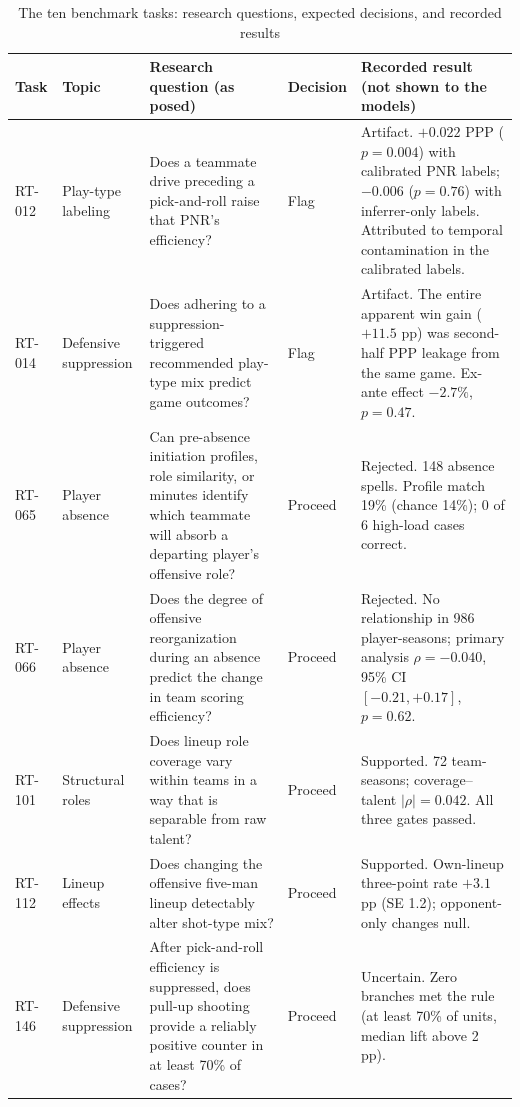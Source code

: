 \documentclass[11pt]{article}
\begin{document}
\begin{table}[ht]
\centering
\caption{The ten benchmark tasks: research questions, expected decisions, and recorded results}
\label{tab:tasks}
\small
\begin{tabular}{p{0.6cm}p{1.6cm}p{4.4cm}p{1.0cm}p{5.2cm}}
\toprule
Task & Topic & Research question (as posed) & Decision & Recorded result (not shown to the models) \\
\midrule
RT-012 & Play-type labeling & Does a teammate drive preceding a pick-and-roll raise that PNR's efficiency? & Flag & Artifact. $+0.022$ PPP ($p = 0.004$) with calibrated PNR labels; $-0.006$ ($p = 0.76$) with inferrer-only labels. Attributed to temporal contamination in the calibrated labels. \\
\addlinespace
RT-014 & Defensive suppression & Does adhering to a suppression-triggered recommended play-type mix predict game outcomes? & Flag & Artifact. The entire apparent win gain ($+11.5$ pp) was second-half PPP leakage from the same game. Ex-ante effect $-2.7\%$, $p = 0.47$. \\
\addlinespace
RT-065 & Player absence & Can pre-absence initiation profiles, role similarity, or minutes identify which teammate will absorb a departing player's offensive role? & Proceed & Rejected. 148 absence spells. Profile match 19\% (chance 14\%); 0 of 6 high-load cases correct. \\
\addlinespace
RT-066 & Player absence & Does the degree of offensive reorganization during an absence predict the change in team scoring efficiency? & Proceed & Rejected. No relationship in 986 player-seasons; primary analysis $\rho = -0.040$, 95\% CI $[-0.21, +0.17]$, $p = 0.62$. \\
\addlinespace
RT-101 & Structural roles & Does lineup role coverage vary within teams in a way that is separable from raw talent? & Proceed & Supported. 72 team-seasons; coverage--talent $|\rho| = 0.042$. All three gates passed. \\
\addlinespace
RT-112 & Lineup effects & Does changing the offensive five-man lineup detectably alter shot-type mix? & Proceed & Supported. Own-lineup three-point rate $+3.1$ pp (SE 1.2); opponent-only changes null. \\
\addlinespace
RT-146 & Defensive suppression & After pick-and-roll efficiency is suppressed, does pull-up shooting provide a reliably positive counter in at least 70\% of cases? & Proceed & Uncertain. Zero branches met the rule (at least 70\% of units, median lift above 2 pp). \\

\end{tabular}
\end{table}
\end{document}
